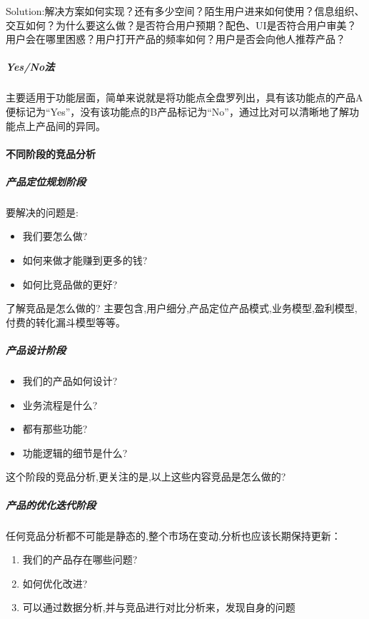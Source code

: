 \documentclass[letterpaper,10pt,english]{sphinxmanual}
\begin{document}
Solution:解决方案如何实现？还有多少空间？陌生用户进来如何使用？信息组织、交互如何？为什么要这么做？是否符合用户预期？配色、UI是否符合用户审美？用户会在哪里困惑？用户打开产品的频率如何？用户是否会向他人推荐产品？


\subparagraph{Yes/No法}
\label{\detokenize{chapter_knowledge/goods_analysis:yes-no}}
主要适用于功能层面，简单来说就是将功能点全盘罗列出，具有该功能点的产品A便标记为“Yes”，没有该功能点的B产品标记为“No”，通过比对可以清晰地了解功能点上产品间的异同。


\paragraph{不同阶段的竞品分析}
\label{\detokenize{chapter_knowledge/goods_analysis:id25}}

\subparagraph{产品定位规划阶段}
\label{\detokenize{chapter_knowledge/goods_analysis:id26}}
要解决的问题是:
\begin{itemize}
\item {} 
我们要怎么做?

\item {} 
如何来做才能赚到更多的钱?

\item {} 
如何比竞品做的更好?

\end{itemize}

了解竞品是怎么做的?
主要包含,用户细分,产品定位产品模式,业务模型,盈利模型,付费的转化漏斗模型等等。


\subparagraph{产品设计阶段}
\label{\detokenize{chapter_knowledge/goods_analysis:id27}}\begin{itemize}
\item {} 
我们的产品如何设计?

\item {} 
业务流程是什么?

\item {} 
都有那些功能?

\item {} 
功能逻辑的细节是什么?

\end{itemize}

这个阶段的竞品分析,更关注的是,以上这些内容竞品是怎么做的?


\subparagraph{产品的优化迭代阶段}
\label{\detokenize{chapter_knowledge/goods_analysis:id28}}
任何竞品分析都不可能是静态的,整个市场在变动,分析也应该长期保持更新：
\begin{enumerate}
%
\item {} 
我们的产品存在哪些问题?

\item {} 
如何优化改进?

\item {} 
可以通过数据分析,并与竞品进行对比分析来，发现自身的问题

\end{enumerate}
\end{document}
